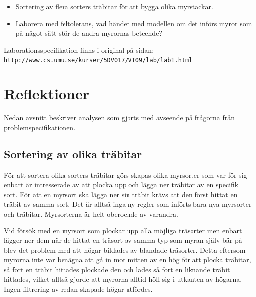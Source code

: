 \documentclass[titlepage, a4paper, 12pt]{article}
\begin{document}
\begin{itemize}
\item Sortering av flera sorters träbitar för att bygga olika
  myrstackar.
\item Laborera med feltolerans, vad händer med modellen om det införs
  myror som på något sätt stör de andra myrornas beteende?
\end{itemize}

Laborationsspecifikation finns i original på sidan:\\
\verb!http://www.cs.umu.se/kurser/5DV017/VT09/lab/lab1.html!

\section{Reflektioner}
Nedan avsnitt beskriver analysen som gjorts med avseende på frågorna
från problemspecifikationen.

\subsection{Sortering av olika träbitar}


För att sortera olika sorters träbitar görs skapas olika myrsorter som
var för sig enbart är intresserade av att plocka upp och lägga ner
träbitar av en specifik sort. För att en myrsort ska lägga ner sin
träbit krävs att den först hittat en träbit av samma sort. Det är
alltså inga ny regler som införts bara nya myrsorter och
träbitar. Myrsorterna är helt oberoende av varandra.

Vid försök med en myrsort som plockar upp alla möjliga träsorter men
enbart lägger ner dem när de hittat en träsort av samma typ som myran
själv bär på blev det problem med att högar bildades av blandade
träsorter. Detta eftersom myrorna inte var benägna att gå in mot
mitten av en hög för att plocka träbitar, så fort en träbit hittades
plockade den och lades så fort en liknande träbit hittades, vilket
alltså gjorde att myrorna alltid höll sig i utkanten av högarna. Ingen
filtrering av redan skapade högar utfördes.
\end{document}
